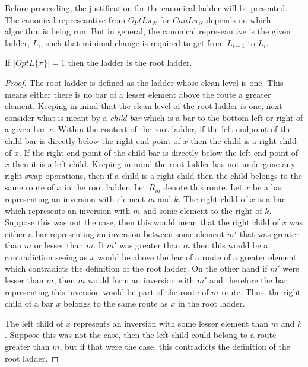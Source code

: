 Before proceeding, the justification for the canonical ladder will be presented. 
The canonical represeantive from $OptL{\pi_{N}}$ for $CanL{\pi_{N}}$ depends 
on which algorithm is being run. But in general, the canonical represeantive is 
the given ladder, $L_{i}$, such that minimal change is required to get from 
$L_{i-1}$ to $L_{i}$. 
\begin{theorem}
    If $|OptL\{\pi\}|=1$ then the ladder is the root ladder.
\end{theorem} 
\begin{proof}
    The root ladder is defined as the ladder whose clean level is one.
    This means either there is no bar of a lesser element above the route a 
    greater element. Keeping in mind that the clean level of the root ladder is one, next consider what is meant by a  \emph{child bar}
     which is a bar to the bottom left or right of a given bar $x$. Within the context of the root ladder, 
     if the left endpoint of the child bar is directly below the right end point of $x$ then the child is a 
    right child of $x$. If the right end point of the child bar is directly 
    below the left end point of $x$ then it is a left child. 
    Keeping in mind the root ladder has not undergone any right swap operations, then
    if a child is a right child 
    then the child belongs to the same route of $x$ in the root ladder. 
    Let $R_{m}$ denote this route. Let $x$ be a bar representing an inversion with element $m$ and $k$.
    The right child of $x$ is a bar which represents an inversion 
    with $m$ and some element to the right of $k$. Suppose this was not the case, 
    then this would mean that the right child of $x$ was either a bar representing an inversion 
    between some element $m'$ that was greater than $m$ or lesser than $m$. If $m'$ was 
    greater than $m$ then this would be a contradiction seeing as $x$ would be above the bar of a route 
    of a greater element which contradicts the definition of the root ladder. On the other hand if 
    $m'$ were lesser than $m$, then $m$ would form an inversion with $m'$ and therefore 
    the bar representing this inversion would be part of the route of $m$ route. Thus, the right child 
    of a bar $x$ belongs to the same route as $x$ in the root ladder.\par The left child of $x$
    represents an inversion with some lesser element than $m$ and $k$. Suppose this was not the case, 
    then the left child could belong to a route greater than $m$, but if that were the case, this contradicts 
    the definition of the root ladder.

\end{proof}
